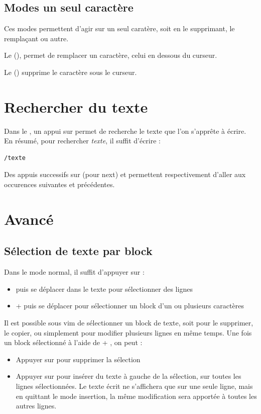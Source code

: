 \documentclass[a4paper,twoside]{article}
\begin{document}
\subsection{Modes \og un seul caractère\fg}
\begin{remarque}
Ces modes permettent d'agir sur un seul caratère, soit en le supprimant, le remplaçant ou autre.
\end{remarque}

Le  (), permet de remplacer un caractère, celui en dessous du curseur.

Le  () supprime le caractère sous le curseur.


\section{Rechercher du texte}
Dans le , un appui sur \touche{/} permet de recherche le texte que l'on s'apprête à écrire. En résumé, pour rechercher \emph{texte}, il suffit d'écrire :
\begin{verbatim}
/texte
\end{verbatim}
Des appuis successifs sur  (pour next) et  permettent respectivement d'aller aux occurences suivantes et précédentes.

\section{Avancé}
\subsection{Sélection de texte par block}
Dans le mode normal, il suffit d'appuyer sur :
\begin{itemize}
\item {} puis se déplacer dans le texte pour sélectionner des lignes
\item {} +  puis se déplacer pour sélectionner un block d'un ou plusieurs caractères
\end{itemize}

Il est possible sous vim de sélectionner un block de texte, soit pour le supprimer, le copier, ou simplement pour modifier plusieurs lignes en même temps. Une fois un block sélectionné à l'aide de  + , on peut : 
\begin{itemize}
\item Appuyer sur  pour supprimer la sélection
\item Appuyer sur  pour insérer du texte à gauche de la sélection, sur toutes les lignes sélectionnées. Le texte écrit ne s'affichera que sur une seule ligne, mais en quittant le mode insertion, la même modification sera apportée à toutes les autres lignes. 
\end{itemize}
\end{document}
